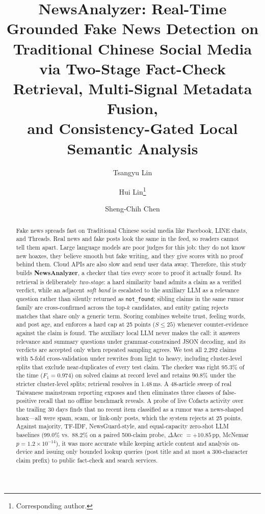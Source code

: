 \documentclass[twoside]{llncs}
\title{NewsAnalyzer: Real-Time Grounded Fake News Detection on Traditional Chinese Social Media\\
via Two-Stage Fact-Check Retrieval, Multi-Signal Metadata Fusion,\\
and Consistency-Gated Local Semantic Analysis}
\author{Tsangyu Lin\inst{1} \and Hui Lin\inst{1}\thanks{Corresponding author.} \and Sheng-Chih Chen\inst{2}}
\institute{
Department of Computer Science and Information Engineering, \\
Tamkang University, New Taipei City 25137, Taiwan \\
\email{jefflin.je598@gmail.com, 121678@mail.tku.edu.tw}
\and
National Chengchi University, Taipei, Taiwan \\
\email{scchen@nccu.edu.tw}}
\begin{document}
\maketitle

\begin{abstract}
Fake news spreads fast on Traditional Chinese social media like Facebook, LINE chats, and Threads. Real news and fake posts look the same in the feed, so readers cannot tell them apart. Large language models are poor judges for this job: they do not know new hoaxes, they believe smooth but fake writing, and they give scores with no proof behind them. Cloud APIs are also slow and send user data away. Therefore, this study builds \textbf{NewsAnalyzer}, a checker that ties every score to proof it actually found. Its retrieval is deliberately \emph{two-stage}: a hard similarity band admits a claim as a verified verdict, while an adjacent \emph{soft band} is escalated to the auxiliary LLM as a relevance question rather than silently returned as \texttt{not\_found}; sibling claims in the same rumor family are cross-confirmed across the top-$k$ candidates, and entity gating rejects matches that share only a generic term. Scoring combines website trust, feeling words, and post age, and enforces a hard cap at 25 points ($S \le 25$) whenever counter-evidence against the claim is found. The auxiliary local LLM never makes the call: it answers relevance and summary questions under grammar-constrained JSON decoding, and its verdicts are accepted only when repeated sampling agrees. We test all 2,292 claims with 5-fold cross-validation under rewrites from light to heavy, including cluster-level splits that exclude near-duplicates of every test claim. The checker was right 95.3\% of the time ($F_1 = 0.974$) on solved claims at record level and retains 90.8\% under the stricter cluster-level splits; retrieval resolves in 1.48\,ms. A 48-article sweep of real Taiwanese mainstream reporting exposes and then eliminates three classes of false-positive recall that no offline benchmark reveals. A probe of live Cofacts activity over the trailing 30 days finds that no recent item classified as a rumor was a news-shaped hoax---all were spam, scam, or link-only posts, which the system rejects at 25 points. Against majority, TF-IDF, NewsGuard-style, and equal-capacity zero-shot LLM baselines (99.0\% vs.\ 88.2\% on a paired 500-claim probe, $\Delta$Acc $= +10.85$\,pp, McNemar $p = 1.2\times10^{-14}$), it was more accurate while keeping article content and analysis on-device and issuing only bounded lookup queries (post title and at most a 300-character claim prefix) to public fact-check and search services.
\end{abstract}
\end{document}
